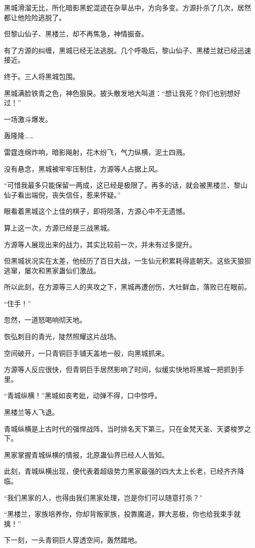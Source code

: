 \begin{this_body}
黑城滑溜无比，所化暗影黑蛇混迹在杂草丛中，方向多变。方源扑杀了几次，居然都让他险险逃脱了。

但黎山仙子、黑楼兰，却不再焦急，神情振奋。

有了方源的纠缠，黑城已经无法逃脱。几个呼吸后，黎山仙子、黑楼兰就已经迅速接近。

终于。三人将黑城包围。

黑城满脸铁青之色，神色狠戾。披头散发地大叫道：“想让我死？你们也别想好过！”

一场激斗爆发。

轰隆隆……

雷霆连绵炸响，暗影飚射，花木纷飞，气力纵横，泥土四溅。

没有悬念，黑城被牢牢压制住，方源等人占据上风。

“可惜我最多只能保留一两成，这已经是极限了。再多的话，就会被黑楼兰、黎山仙子看出端倪，丧失信任，惹来怀疑。”

眼看着黑城这个上佳的棋子，即将陨落，方源心中不无遗憾。

算上这一次，方源已经是三战黑城。

方源等人展现出来的战力，其实比较前一次，并未有过多提升。

但黑城状况实在太差，他经历了百日大战，一生仙元积累耗得底朝天。这些天狼狈逃窜，屡次和黑家蛊仙们激战。

所以此刻，在方源等三人的夹攻之下，黑城再遭创伤，大吐鲜血，落败已在眼前。

“住手！”

忽然，一道怒喝响彻天地。

恢弘刺目的青光，陡然照耀这片战场。

空间破开，一只青铜巨手铺天盖地一般，向黑城抓来。

方源等人反应很快，但青铜巨手居然影响了时间，似缓实快地将黑城一把抓到手里。

“青城纵横！”黑城如丧考妣，动弹不得，口中惊呼。

黑楼兰等人飞退。

青城纵横是上古时代的强悍战阵，当时排名天下第三。只在金梵天圣、天婆梭罗之下。

黑家掌握青城纵横的情报，北原蛊仙界已经人人皆知。

此刻，青城纵横出现，便代表着超级势力黑家最强的四大太上长老，已经齐齐降临。

“我们黑家的人，也得由我们黑家处理，岂是你们可以随意打杀？”

“黑楼兰，家族培养你，你却背叛家族，投靠魔道，罪大恶极，你也给我束手就擒！”

下一刻，一头青铜巨人穿透空间，轰然踏地。


\end{this_body}
